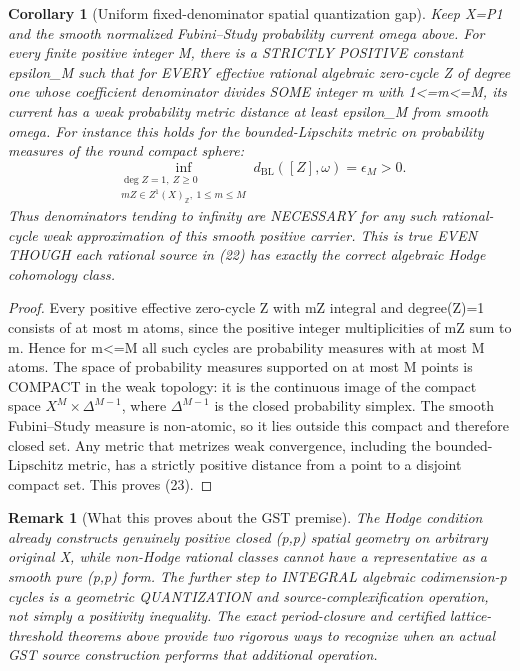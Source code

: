 \documentclass[11pt]{article}
\newtheorem{corollary}[theorem]{Corollary}
\newtheorem{remark}[theorem]{Remark}
\begin{document}
\begin{corollary}[Uniform fixed-denominator spatial quantization gap]
Keep X=P1 and the
smooth normalized
Fubini--Study probability
current omega above.
For every finite
positive integer M,
there is a
STRICTLY POSITIVE
constant epsilon_M
such that for EVERY
effective rational
algebraic zero-cycle
Z of degree one whose
coefficient denominator
divides SOME integer
m with 1<=m<=M,
its current has
a weak probability
metric distance
at least epsilon_M
from smooth omega.
For instance this
holds for the
bounded-Lipschitz
metric on probability
measures of the
round compact sphere:
\[
 \boxed{
 \inf_{\substack{\deg Z=1,\ Z\ge0\\
       mZ\in Z^1(X)_\mathbb Z,\
       1\le m\le M}}
  d_{\mathrm{BL}}([Z],\omega)
                  =\epsilon_M>0.
 }                                                     \tag{23}
\]
Thus denominators tending
to infinity are NECESSARY
for any such rational-cycle
weak approximation of this
smooth positive carrier.
This is true EVEN THOUGH
each rational source in
(22) has exactly the
correct algebraic Hodge
cohomology class.
\end{corollary}
\begin{proof}
Every positive effective
zero-cycle Z with
mZ integral and
degree(Z)=1 consists
of at most m atoms,
since the positive
integer multiplicities
of mZ sum to m.
Hence for m<=M all
such cycles are
probability measures
with at most M atoms.
The space of
probability measures
supported on at
most M points is
COMPACT in the
weak topology:
it is the continuous
image of the compact
space $X^M\times
\Delta^{M-1}$,
where $\Delta^{M-1}$
is the closed
probability simplex.
The smooth Fubini--Study
measure is non-atomic,
so it lies outside
this compact and
therefore closed set.
Any metric that
metrizes weak
convergence, including
the bounded-Lipschitz
metric, has a strictly
positive distance
from a point to a
disjoint compact set.
This proves (23).
\end{proof}

\begin{remark}[What this proves about the GST premise]
The Hodge condition already
constructs genuinely
positive closed
(p,p) spatial geometry
on arbitrary original X,
while non-Hodge rational
classes cannot have
a representative as a
smooth pure (p,p) form.
The further step to
INTEGRAL algebraic
codimension-p cycles
is a geometric
QUANTIZATION and
source-complexification
operation, not simply
a positivity inequality.
The exact period-closure
and certified
lattice-threshold
theorems above provide
two rigorous ways to
recognize when an
actual GST source
construction performs
that additional
operation.
\end{remark}
\end{document}
